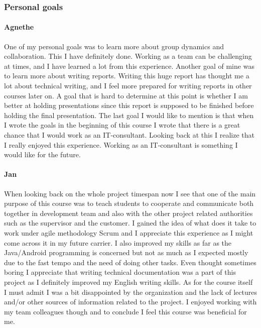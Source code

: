 \subsubsection{Personal goals}

\paragraph{Agnethe}
One of my personal goals was to learn more about group dynamics and collaboration. This I have definitely done. Working as a team can be challenging at times, and I have learned a lot from this experience. Another goal of mine was to learn more about writing reports. Writing this huge report has thought me a lot about technical writing, and I feel more prepared for writing reports in other courses later on. A goal that is hard to determine at this point is whether I am better at holding presentations since this report is supposed to be finished before holding the final presentation. The last goal I would like to mention is that when I wrote the goals in the beginning of this course I wrote that  there is a great chance that I would work as an IT-consultant. Looking back at this I realize that I really enjoyed this experience. Working as an IT-consultant is something I would like for the future. 

\paragraph{Jan}
When looking back on the whole project timespan now I see that one of the main purpose of this course was to teach students to cooperate and communicate both together in development team and also with the other project related authorities such as the supervisor and the customer. I gained the idea of what does it take to work under agile methodology Scrum and I appreciate this experience as I might come across it in my future carrier. I also improved my skills as far as the Java/Android programming is concerned but not as much as I expected mostly due to the fast tempo and the need of doing other tasks. Even thought sometimes boring I appreciate that writing technical documentation was a part of this project as I definitely improved my English writing skills. As for the course itself I must admit I was a bit disappointed by the organization and the lack of lectures and/or other sources of information related to the project. I enjoyed working with my team colleagues though and to conclude I feel this course was beneficial for me.

